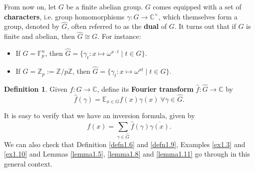 \documentclass{article}
\theoremstyle{definition}
\newtheorem{defn}[theorem]{Definition}
\begin{document}
\vspace{1mm}
 
From now on, let $G$ be a finite abelian group. $G$ comes equipped with a set of \textbf{characters}, i.e. group homomorphisms $\gamma : G \to \mathbb{C}^\times$, which themselves form a group, denoted by $\hat{G}$, often referred to as the \textbf{dual} of $G$. It turns out that if $G$ is finite and abelian, then $\hat{G} \cong G$. For instance:
\begin{itemize}
    \item If $G = \mathbb{F}_p^n$, then $\hat{G} = \{\gamma_t : x \mapsto \omega^{x \cdot t} \mid t \in G\}$.
    \item If $G = \mathbb{Z}_p := \mathbb{Z}/p\mathbb{Z}$, then $\hat{G} = \{\gamma_t : x \mapsto \omega^{xt} \mid t \in G\}$.
\end{itemize}
\begin{defn}
    Given $f : G \to \mathbb{C}$, define its \textbf{Fourier transform} $\hat{f}: \hat{G} \to \mathbb{C}$ by \[
    \hat{f}(\gamma) = \mathbb{E}_{x \in G}f(x)\gamma(x) ~\forall \gamma \in \hat{G}.
    \]
\end{defn}
It is easy to verify that we have an inversion formula, given by \[
f(x) = \sum_{\gamma \in \hat{G}}^{} \hat{f}(\gamma)\overline{\gamma(x)}.
\]
We can also check that Definition \ref{defn1.6} and \ref{defn1.9}, Examples \ref{ex1.3} and \ref{ex1.10} and Lemmas \ref{lemma1.5}, \ref{lemma1.8} and \ref{lemma1.11} go through in this general context.
\end{document}
